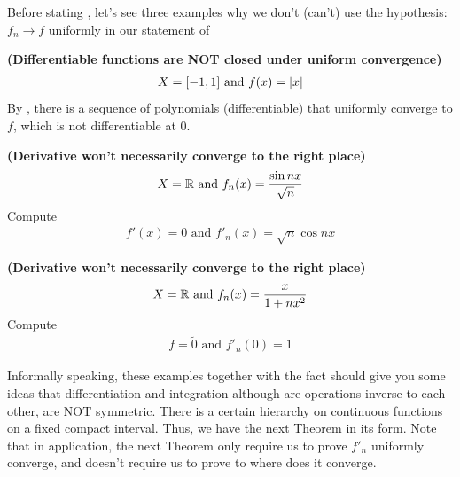 \documentclass{report}
\begin{document}
\begin{mdframed}
Before stating , let's see three examples why we don't (can't) use the hypothesis: $f_n \to f$ uniformly in our statement of  
\begin{Example}{\textbf{(Differentiable functions are NOT closed under uniform convergence)}}{}
\begin{align*}
X=[-1,1]\text{ and }f(x)=\left|x\right|
\end{align*}
By , there is a sequence of polynomials (differentiable) that uniformly converge to $f$, which is not differentiable at  $0$. 
\end{Example}
\begin{Example}{\textbf{(Derivative won't necessarily converge to the right place)}}{}
\begin{align*}
X=\mathbb{R} \text{ and }f_n(x)=\frac{\sin nx}{\sqrt{n} }
\end{align*}
Compute 
\begin{align*}
f'(x)=0 \text{ and }f'_n(x)=\sqrt{n} \cos nx
\end{align*}
\end{Example}
\begin{Example}{\textbf{(Derivative won't necessarily converge to the right place)}}{}
\begin{align*}
X=\mathbb{R} \text{ and }f_n(x)=\frac{x}{1+nx^2}
\end{align*}
Compute 
\begin{align*}
f=\tilde{0} \text{ and }f'_n(0)=1
\end{align*}
\end{Example}
Informally speaking, these examples together with the fact  should give you some ideas that differentiation and integration although are operations inverse to each other, are NOT symmetric. There is a certain hierarchy on continuous functions on a fixed compact interval. Thus, we have the next Theorem in its form. Note that in application, the next Theorem only require us to prove $f'_n$ uniformly converge, and doesn't require us to prove to where does it converge. 
\end{mdframed}
\end{document}
